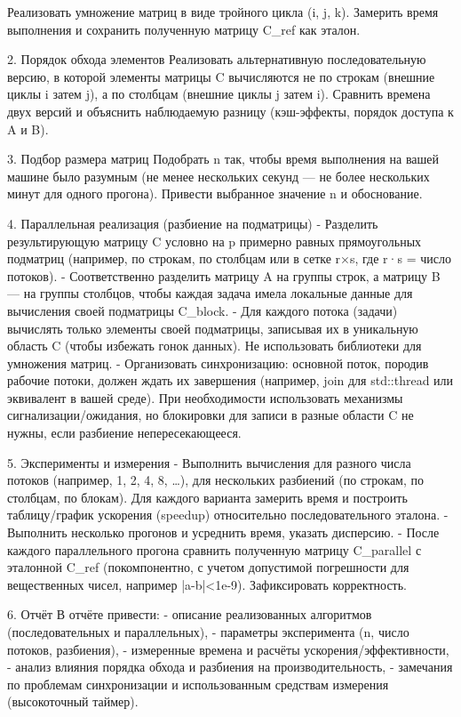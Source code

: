 \documentclass[a4paper, 14pt]{extarticle}
\begin{document}
  Реализовать умножение матриц в виде тройного цикла (i, j, k). Замерить время выполнения и сохранить полученную матрицу C\_ref как эталон.

2. Порядок обхода элементов
  Реализовать альтернативную последовательную версию, в которой элементы матрицы C вычисляются не по строкам (внешние циклы i затем j), а по столбцам (внешние циклы j затем i). Сравнить времена двух версий и объяснить наблюдаемую разницу (кэш-эффекты, порядок доступа к A и B).

3. Подбор размера матриц
  Подобрать n так, чтобы время выполнения на вашей машине было разумным (не менее нескольких секунд — не более нескольких минут для одного прогона). Привести выбранное значение n и обоснование.

4. Параллельная реализация (разбиение на подматрицы)
  - Разделить результирующую матрицу C условно на p примерно равных прямоугольных подматриц (например, по строкам, по столбцам или в сетке r×s, где r·s = число потоков).
  - Соответственно разделить матрицу A на группы строк, а матрицу B — на группы столбцов, чтобы каждая задача имела локальные данные для вычисления своей подматрицы C\_block.
  - Для каждого потока (задачи) вычислять только элементы своей подматрицы, записывая их в уникальную область C (чтобы избежать гонок данных). Не использовать библиотеки для умножения матриц.
  - Организовать синхронизацию: основной поток, породив рабочие потоки, должен ждать их завершения (например, join для std::thread или эквивалент в вашей среде). При необходимости использовать механизмы сигнализации/ожидания, но блокировки для записи в разные области C не нужны, если разбиение непересекающееся.

5. Эксперименты и измерения
  - Выполнить вычисления для разного числа потоков (например, 1, 2, 4, 8, …), для нескольких разбиений (по строкам, по столбцам, по блокам). Для каждого варианта замерить время и построить таблицу/график ускорения (speedup) относительно последовательного эталона.
  - Выполнить несколько прогонов и усреднить время, указать дисперсию.
  - После каждого параллельного прогона сравнить полученную матрицу C\_parallel с эталонной C\_ref (покомпонентно, с учетом допустимой погрешности для вещественных чисел, например |a-b|<1e-9). Зафиксировать корректность.

6. Отчёт
  В отчёте привести:
  - описание реализованных алгоритмов (последовательных и параллельных),
  - параметры эксперимента (n, число потоков, разбиения),
  - измеренные времена и расчёты ускорения/эффективности,
  - анализ влияния порядка обхода и разбиения на производительность,
  - замечания по проблемам синхронизации и использованным средствам измерения (высокоточный таймер).
\end{document}
